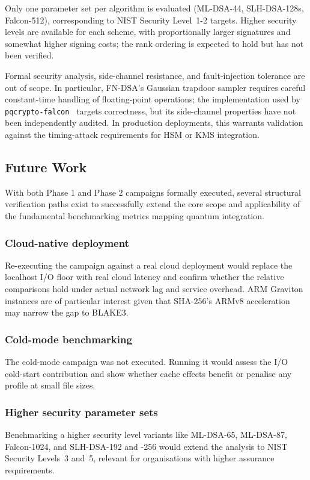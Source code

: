 \documentclass[12pt,a4paper]{article}
\begin{document}
Only one parameter set per algorithm is evaluated (ML-DSA-44, SLH-DSA-128s, Falcon-512), corresponding to NIST Security Level~1-2 targets. Higher security levels are available for each scheme, with proportionally larger signatures and somewhat higher signing costs; the rank ordering is expected to hold but has not been verified.

Formal security analysis, side-channel resistance, and fault-injection tolerance are out of scope. In particular, FN-DSA's Gaussian trapdoor sampler requires careful constant-time handling of floating-point operations; the implementation used by \texttt{pqcrypto-falcon}~\cite{pqcrypto-rust-crate} targets correctness, but its side-channel properties have not been independently audited. In production deployments, this warrants validation against the timing-attack requirements for HSM or KMS integration.

\subsection{Future Work}
\label{sec:discussion:future}

With both Phase 1 and Phase 2 campaigns formally executed, several structural verification paths exist to successfully extend the core scope and applicability of the fundamental benchmarking metrics mapping quantum integration.

\subsubsection{Cloud-native deployment} Re-executing the campaign against a real cloud deployment would replace the localhost I/O floor with real cloud latency and confirm whether the relative comparisons hold under actual network lag and service overhead. ARM Graviton instances are of particular interest given that SHA-256's ARMv8 acceleration may narrow the gap to BLAKE3.

\subsubsection{Cold-mode benchmarking} The cold-mode campaign was not executed. Running it would assess the I/O cold-start contribution and show whether cache effects benefit or penalise any profile at small file sizes.

\subsubsection{Higher security parameter sets} Benchmarking a higher security level variants like ML-DSA-65, ML-DSA-87, Falcon-1024, and SLH-DSA-192 and -256 would extend the analysis to NIST Security Levels~3 and~5, relevant for organisations with higher assurance requirements.
\end{document}
